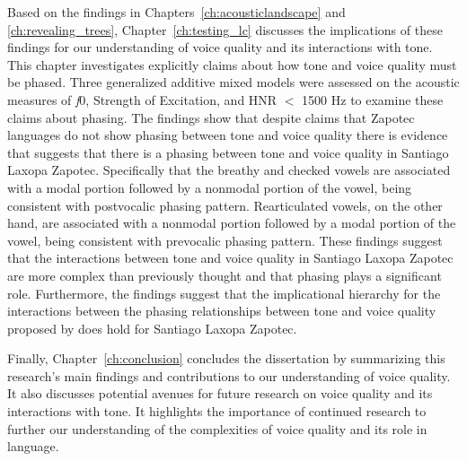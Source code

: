 Based on the findings in Chapters~\ref{ch:acousticlandscape} and \ref{ch:revealing_trees}, Chapter~\ref{ch:testing_lc} discusses the implications of these findings for our understanding of voice quality and its interactions with tone. This chapter investigates explicitly  claims about how tone and voice quality must be phased. Three generalized additive mixed models were assessed on the acoustic measures of \textit{f}0, Strength of Excitation, and HNR $<$ 1500 Hz to examine these claims about phasing. The findings show that despite  claims that Zapotec languages do not show phasing between tone and voice quality there is evidence that suggests that there is a phasing between tone and voice quality in Santiago Laxopa Zapotec. Specifically that the breathy and checked vowels are associated with a modal portion followed by a nonmodal portion of the vowel, being consistent with  postvocalic phasing pattern. Rearticulated vowels, on the other hand, are associated with a nonmodal portion followed by a modal portion of the vowel, being consistent with  prevocalic phasing pattern. These findings suggest that the interactions between tone and voice quality in Santiago Laxopa Zapotec are more complex than previously thought and that phasing plays a significant role. Furthermore, the findings suggest that the implicational hierarchy for the interactions between the phasing relationships between tone and voice quality proposed by \citet{silvermanLaryngealComplexityOtomanguean1997} does hold for Santiago Laxopa Zapotec. 

Finally, Chapter~\ref{ch:conclusion} concludes the dissertation by summarizing this research's main findings and contributions to our understanding of voice quality. It also discusses potential avenues for future research on voice quality and its interactions with tone. It highlights the importance of continued research to further our understanding of the complexities of voice quality and its role in language.

